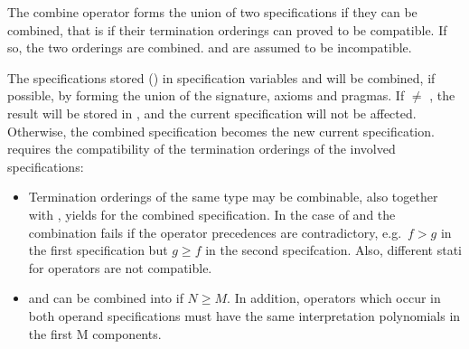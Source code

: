The combine operator forms the union of two specifications if they can be combined, 
that is if their termination orderings can proved to be compatible. If so, the two orderings
are combined.  and  are assumed to be incompatible.\bigskip

\begin{command}
The specifications  stored ( {}) 
in specification variables  and 
will  be combined, if possible, by forming
the union of the signature, axioms and pragmas.
If  $\neq$ , the result will be stored in
, and the current specification will not be affected.
Otherwise, the combined specification becomes the new current
specification.
 requires the compatibility of the termination
orderings of the involved specifications:
\begin{itemize}
\item
Termination orderings of the same type may be combinable, also  together with
, yields  for the combined specification.
In the case of  and  
the combination fails if the operator precedences are contradictory,
e.g.\ $f > g$ in the first specification but $g \geq f$ in the second 
specifcation. Also, different stati for operators are not compatible.
\item
{} and  can be combined 
into  if $N \geq M$. In addition, operators 
which occur in both operand specifications must have
the same interpretation polynomials in the first M components.
\end{itemize}
\end{command}
